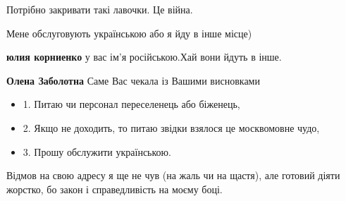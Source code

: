 \begin{itemize}
\begin{itemize}
 
Потрібно закривати такі лавочки. Це війна.

\end{itemize}

 
Мене обслуговують українською або я йду в інше місце)

\begin{itemize}
 
\textbf{юлия корниенко} у вас ім'я російською.Хай вони йдуть в інше.

 
\textbf{Олена Заболотна} Саме Вас чекала із Вашими висновками
\end{itemize}

 

\begin{itemize}
  \item 1. Питаю чи персонал переселенець або біженець,
  \item 2. Якщо не доходить, то питаю звідки взялося це москвомовне чудо,
  \item 3. Прошу обслужити українською.
\end{itemize}

Відмов на свою адресу я ще не чув (на жаль чи на щастя), але готовий діяти
жорстко, бо закон і справедливість на моєму боці.



\end{itemize}
